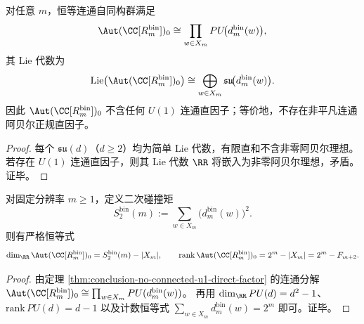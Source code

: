\begin{theorem}\label{thm:conclusion-no-connected-u1-direct-factor}
对任意 \(m\)，恒等连通自同构群满足
\[
\Aut(\CC[R_m^{\mathrm{bin}}])_0
\cong
\prod_{w\in X_m}PU\!\bigl(d_m^{\mathrm{bin}}(w)\bigr),
\]
其 Lie 代数为
\[
\mathrm{Lie}\!\left(\Aut(\CC[R_m^{\mathrm{bin}}])_0\right)
\cong
\bigoplus_{w\in X_m}\mathfrak{su}\!\bigl(d_m^{\mathrm{bin}}(w)\bigr).
\]
因此 \(\Aut(\CC[R_m^{\mathrm{bin}}])_0\) 不含任何 \(U(1)\) 连通直因子；等价地，不存在非平凡连通阿贝尔正规直因子。
\end{theorem}
\begin{proof}
每个 \(\mathfrak{su}(d)\)（\(d\ge 2\)）均为简单 Lie 代数，有限直和不含非零阿贝尔理想。
若存在 \(U(1)\) 连通直因子，则其 Lie 代数 \(\RR\) 将嵌入为非零阿贝尔理想，矛盾。证毕。
\end{proof}

\begin{corollary}\label{cor:conclusion-collision2-lie-dim-rank}
对固定分辨率 \(m\ge 1\)，定义二次碰撞矩
\[
S_2^{\mathrm{bin}}(m):=\sum_{w\in X_m}\bigl(d_m^{\mathrm{bin}}(w)\bigr)^2.
\]
则有严格恒等式
\[
\dim_{\RR}\Aut(\CC[R_m^{\mathrm{bin}}])_0
=S_2^{\mathrm{bin}}(m)-|X_m|,
\qquad
\mathrm{rank}\,\Aut(\CC[R_m^{\mathrm{bin}}])_0
=2^m-|X_m|
=2^m-F_{m+2}.
\]
\end{corollary}
\begin{proof}
由定理 \ref{thm:conclusion-no-connected-u1-direct-factor} 的连通分解
\(
\Aut(\CC[R_m^{\mathrm{bin}}])_0\cong\prod_{w\in X_m}PU(d_m^{\mathrm{bin}}(w))
\)。
再用 \(\dim_{\RR}PU(d)=d^2-1\)、\(\mathrm{rank}\,PU(d)=d-1\) 以及计数恒等式
\(
\sum_{w\in X_m}d_m^{\mathrm{bin}}(w)=2^m
\)
即可。证毕。
\end{proof}

